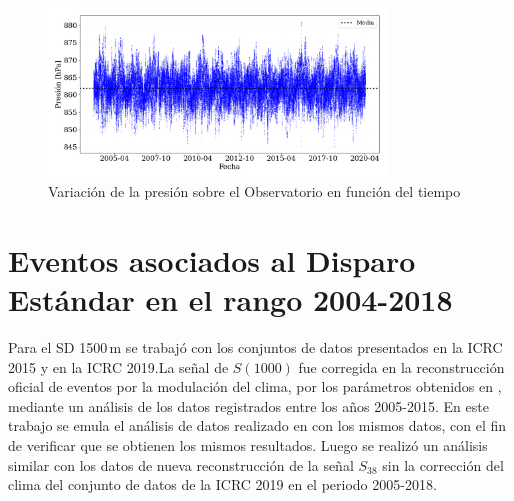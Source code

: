 \begin{figure}[H]
	\centering
		\includegraphics[width=0.8\textwidth]{Graphs/clima/presion_v2.png}
	\caption{Variación de la presión sobre el Observatorio en función del tiempo}
  \label{fig:clima_p}
\end{figure}


\section{Eventos asociados al Disparo Estándar en el rango 2004-2018}\label{Stan_modulacion}	
	
Para el SD 1500\,m se trabajó con los conjuntos de datos  presentados en la ICRC 2015  y  en la ICRC 2019.La señal de $S(1000)$ fue corregida en la reconstrucción oficial de eventos por la modulación del clima, por los parámetros obtenidos en \cite{aab2017impact}, mediante un análisis de los datos registrados  entre los años 2005-2015. En este trabajo se emula el análisis de datos realizado en \cite{aab2017impact} con los mismos datos, con el fin de verificar que se obtienen los mismos resultados. Luego se realizó un análisis similar con los datos de nueva reconstrucción de la señal $S_{38}$ sin la corrección del clima  del conjunto de datos de la ICRC 2019 en el periodo 2005-2018. %

